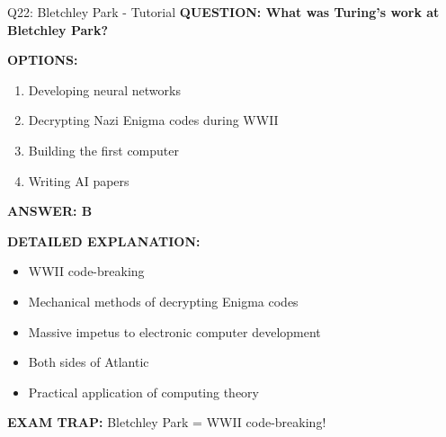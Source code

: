 \documentclass[8pt]{beamer}
\begin{document}
	\begin{frame}{Q22: Bletchley Park - Tutorial}
		\fontsize{6.5}{7.5}\selectfont
		\textbf{QUESTION: What was Turing's work at Bletchley Park?}
		
		\vspace{0.1cm}
		\textbf{OPTIONS:}
		\begin{enumerate}
			\item Developing neural networks
			\item Decrypting Nazi Enigma codes during WWII
			\item Building the first computer
			\item Writing AI papers
		\end{enumerate}
		
		\vspace{0.1cm}
		\textcolor{myblue}{\textbf{ANSWER: B}}
		
		\vspace{0.1cm}
		\textbf{DETAILED EXPLANATION:}
		\begin{itemize}
			\item WWII code-breaking
			\item Mechanical methods of decrypting Enigma codes
			\item Massive impetus to electronic computer development
			\item Both sides of Atlantic
			\item Practical application of computing theory
		\end{itemize}
		
		\vspace{0.1cm}
		\textcolor{myred}{\textbf{EXAM TRAP:}} Bletchley Park = \textcolor{myblue}{WWII code-breaking}!
	\end{frame}
	
\end{document}
